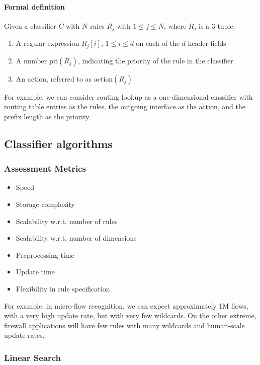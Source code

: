 \documentclass{idc_msc}
\begin{document}
\paragraph{Formal definition}

Given a classifier \(C\) with \(N\) rules \(R_j\) with \(1 \le j \le N\), where \(R_j\) is a 3-tuple:

\begin{enumerate}
  \item A regular expression \(R_j[i]\), \(1 \le i \le d\) on each of the \(d\) header fields
  \item A number \(\text{pri}(R_j)\), indicating the priority of the rule in the classifier
  \item An action, referred to as \(\text{action}(R_j)\)
\end{enumerate}

For example, we can consider routing lookup as a one dimensional classifier with routing table entries as the rules, the outgoing interface as the action, and the prefix length as the priority.

\subsection{Classifier algorithms}

\subsubsection{Assessment Metrics}

\begin{itemize}
  \item Speed
  \item Storage complexity
  \item Scalability w.r.t. number of rules
  \item Scalability w.r.t. number of dimensions
  \item Preprocessing time
  \item Update time
  \item Flexibility in rule specification
\end{itemize}

For example, in micro-flow recognition, we can expect approximately 1M flows, with a very high update rate, but with very few wildcards.
On the other extreme, firewall applications will have few rules with many wildcards and human-scale update rates.

\subsubsection{Linear Search}
\end{document}
